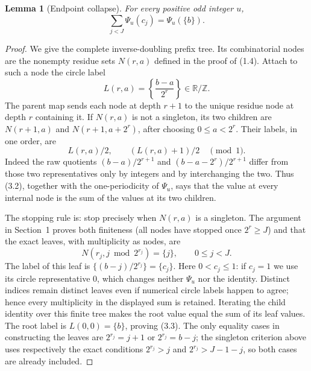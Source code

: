 \documentclass[11pt]{article}
\numberwithin{equation}{section}
\newtheorem{lemma}[theorem]{Lemma}
\newcommand{\1}{\mathbf 1}\newcommand{\F}{\mathcal F}\newcommand{\D}{\mathcal D}
\begin{document}
\begin{lemma}[Endpoint collapse]
For every positive odd integer $u$,
\begin{equation}\sum_{j<J}\Psi_u(c_j)=\Psi_u(\{b\}).           \tag{3.3}\end{equation}
\end{lemma}
\begin{proof}
We give the complete inverse-doubling prefix tree.  Its combinatorial nodes
are the nonempty residue sets $N(r,a)$ defined in the proof of (1.4).  Attach
to such a node the circle label
\[
 L(r,a)=\left\{\frac{b-a}{2^r}\right\}\in\mathbb R/\mathbb Z.
\]
The parent map sends each node at depth $r+1$ to the unique residue node at
depth $r$ containing it.  If $N(r,a)$ is not a singleton, its two children
are $N(r+1,a)$ and $N(r+1,a+2^r)$, after choosing $0\leq a<2^r$.
Their labels, in one order, are
\[
          L(r,a)/2,\qquad (L(r,a)+1)/2
          \quad\pmod 1.
\]
Indeed the raw quotients $(b-a)/2^{r+1}$ and
$(b-a-2^r)/2^{r+1}$ differ from those two representatives only by integers
and by interchanging the two.  Thus (3.2), together with the
one-periodicity of $\Psi_u$, says that the value at every internal node is
the sum of the values at its two children.

The stopping rule is: stop precisely when $N(r,a)$ is a singleton.  The
argument in Section~1 proves both finiteness (all nodes have stopped once
$2^r\geq J$) and that the exact leaves, with multiplicity as nodes, are
\[
       N(r_j,j\bmod 2^{r_j})=\{j\},\qquad 0\leq j<J.
\]
The label of this leaf is
$\{(b-j)/2^{r_j}\}=\{c_j\}$.  Here $0<c_j\leq1$: if $c_j=1$
we use its circle representative $0$, which changes neither $\Psi_u$ nor
the identity.  Distinct indices remain distinct leaves even if numerical
circle labels happen to agree; hence every multiplicity in the displayed
sum is retained.  Iterating the child identity over this finite tree makes
the root value equal the sum of its leaf values.  The root label is
$L(0,0)=\{b\}$, proving (3.3).  The only equality cases in constructing
the leaves are $2^{r_j}=j+1$ or $2^{r_j}=b-j$; the singleton criterion above
uses respectively the exact conditions $2^{r_j}>j$ and
$2^{r_j}>J-1-j$, so both cases are already included.
\end{proof}
\end{document}
